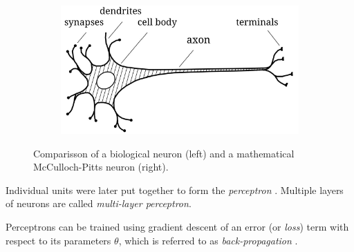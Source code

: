 \begin{figure}[ht]
    \centering
    \begin{subfigure}{0.49\textwidth}
        \raggedright
        \includegraphics[width=\textwidth]{assets/bio_neuron.pdf}
    \end{subfigure}
    \begin{subfigure}{0.5\textwidth}
        \raggedleft
    \end{subfigure}
    \caption{Comparisson of a biological neuron \cite{bio-neuron} (left) and a mathematical McCulloch-Pitts neuron (right).}
    \label{fig:neuron}
\end{figure}
Individual units were later put together to form the \textit{perceptron} \cite{first-perceptron}. Multiple layers of neurons are called \textit{multi-layer perceptron}.

Perceptrons can be trained using gradient descent of an error (or \textit{loss}) term with respect to its parameters $\theta$, which is referred to as \textit{back-propagation} \cite{back-propagation}.

